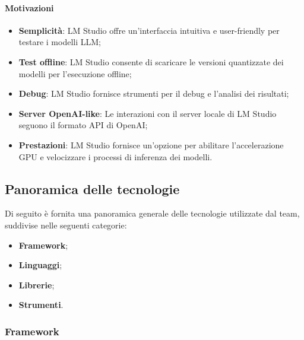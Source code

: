\paragraph*{Motivazioni}
\begin{itemize}
  \item \textbf{Semplicità}: LM Studio offre un'interfaccia intuitiva e user-friendly per testare i modelli LLM;
  \item \textbf{Test offline}: LM Studio consente di scaricare le versioni quantizzate dei modelli per l'esecuzione offline;
  \item \textbf{Debug}: LM Studio fornisce strumenti per il debug e l'analisi dei risultati;
  \item \textbf{Server OpenAI-like}: Le interazioni con il server locale di LM Studio seguono il formato API di OpenAI;
  \item \textbf{Prestazioni}: LM Studio fornisce un’opzione per abilitare l'accelerazione GPU e velocizzare i processi di inferenza dei modelli.
\end{itemize}

\subsection{Panoramica delle tecnologie}\label{sec:panoramica-tecnologie}
\par Di seguito è fornita una panoramica generale delle tecnologie utilizzate dal team, suddivise nelle seguenti categorie:
\begin{itemize}
  \item \textbf{Framework};
  \item \textbf{Linguaggi};
  \item \textbf{Librerie};
  \item \textbf{Strumenti}.
\end{itemize}

\subsubsection{Framework}\label{sec:framework}

